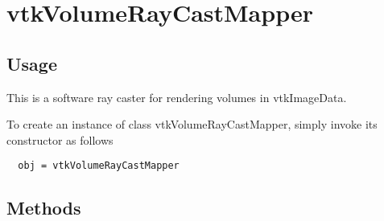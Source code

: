 \section{vtkVolumeRayCastMapper}

\subsection{Usage}

 This is a software ray caster for rendering volumes in vtkImageData. 

To create an instance of class vtkVolumeRayCastMapper, simply
invoke its constructor as follows
\begin{verbatim}
  obj = vtkVolumeRayCastMapper
\end{verbatim}
\subsection{Methods}

